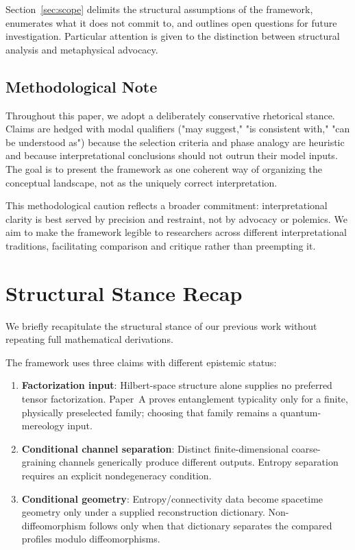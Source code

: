 \documentclass[12pt,a4paper]{article}
\begin{document}
Section~\ref{sec:scope} delimits the structural assumptions of the framework, enumerates what it does not commit to, and outlines open questions for future investigation. Particular attention is given to the distinction between structural analysis and metaphysical advocacy.

\subsection{Methodological Note}

Throughout this paper, we adopt a deliberately conservative rhetorical stance. Claims are hedged with modal qualifiers ("may suggest," "is consistent with," "can be understood as") because the selection criteria and phase analogy are heuristic and because interpretational conclusions should not outrun their model inputs. The goal is to present the framework as one coherent way of organizing the conceptual landscape, not as the uniquely correct interpretation.

This methodological caution reflects a broader commitment: interpretational clarity is best served by precision and restraint, not by advocacy or polemics. We aim to make the framework legible to researchers across different interpretational traditions, facilitating comparison and critique rather than preempting it.

\section{Structural Stance Recap}
\label{sec:stance}

We briefly recapitulate the structural stance of our previous work without repeating full mathematical derivations.

The framework uses three claims with different epistemic status:
\begin{enumerate}
\item \textbf{Factorization input}: Hilbert-space structure alone supplies no preferred tensor factorization.  Paper~A proves entanglement typicality only for a finite, physically preselected family; choosing that family remains a quantum-mereology input.

\item \textbf{Conditional channel separation}: Distinct finite-dimensional coarse-graining channels generically produce different outputs.  Entropy separation requires an explicit nondegeneracy condition.

\item \textbf{Conditional geometry}: Entropy/connectivity data become spacetime geometry only under a supplied reconstruction dictionary.  Non-diffeomorphism follows only when that dictionary separates the compared profiles modulo diffeomorphisms.
\end{enumerate}
\end{document}

